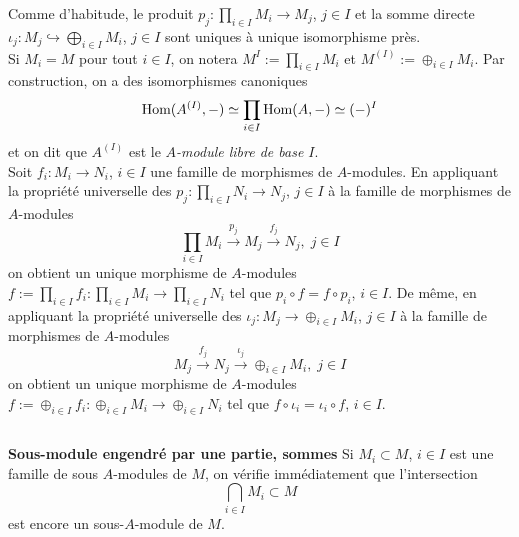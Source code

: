 \documentclass[a4paper, 12pt]{amsart}
\begin{document}
 \noindent Comme d'habitude, le produit $p_{j}:\prod_{i\in I}M_{i}\rightarrow M_{j}$, $j\in I$ et la somme directe $\iota_{j}:M_{j}\hookrightarrow \bigoplus_{i\in I}M_{i}$, $j\in I$ sont uniques à unique isomorphisme près. \\

 


\noindent Si $M_{i}=M$ pour tout $i\in I$, on notera $M^{I}:=\prod_{i\in I}M_{i}$ et $M^{(I)}:=\oplus_{i\in I}M_{i}$. Par construction, on a des isomorphismes   canoniques
$$ \hbox{\rm Hom}(A^{(I)},-)\simeq \prod_{i\in I}\hbox{\rm Hom}(A,-)\simeq (-)^{I}$$
et on dit que $A^{(I)}$ est le \textit{$A$-module libre de base $I$}.\\


\noindent Soit $f_i:M_i\rightarrow N_i$, $i\in I$ une famille de morphismes de $A$-modules. En appliquant la propriété universelle des $p_j:\prod_{i\in I}N_i\rightarrow N_j$, $j\in I$ à la famille de morphismes de $A$-modules 
$$ \prod_{i\in I}M_i\stackrel{p_j}{\rightarrow}M_j\stackrel{f_j}{\rightarrow} N_j,\; j\in I$$
on obtient un unique morphisme de $A$-modules $f:=\prod_{i\in I}f_i:\prod_{i\in I}M_i\rightarrow \prod_{i\in I}N_i$ tel que $p_i\circ f=f\circ p_i$, $i\in I$.   De même,  en appliquant la propriété universelle des $\iota_j:M_j\rightarrow \oplus_{i\in I}M_i$, $j\in I$ à la famille de morphismes de $A$-modules 
$$ M_j\stackrel{f_j}{\rightarrow}N_j\stackrel{\iota_j}{\rightarrow} \oplus_{i\in I}M_i,\; j\in I$$
on obtient un unique morphisme de $A$-modules $f:=\oplus_{i\in I}f_i:\oplus_{i\in I}M_i\rightarrow \oplus_{i\in I}N_i$ tel que $  f\circ \iota_i=  \iota_i\circ f$, $i\in I$.  

\subsection{}\textbf{Sous-module engendré par une partie, sommes}  Si $M_{i}\subset M$, $i\in I$ est une famille de sous $A$-modules de $M$, on vérifie immédiatement que l'intersection $$\bigcap_{i\in I}M_{i}\subset M$$ est encore un sous-$A$-module de $M$.\\
\end{document}
